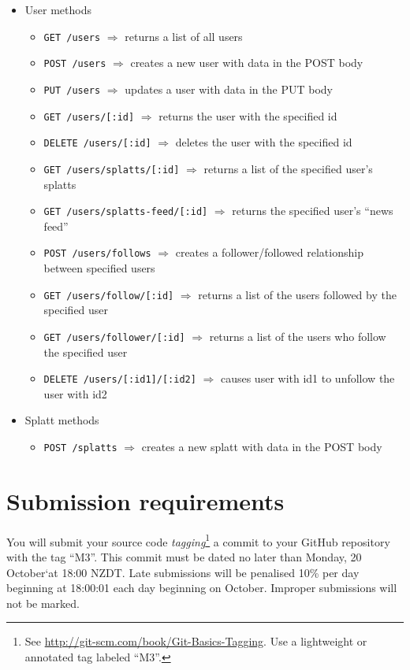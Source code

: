 \documentclass{article}
\begin{document}
\begin{itemize}
 \item User methods
  \begin{itemize}
    \item \texttt{GET /users}  $\Rightarrow$ returns a list of all users
    \item \texttt{POST /users}  $\Rightarrow$ creates a new user with data in the POST body
    \item \texttt{PUT /users}  $\Rightarrow$ updates a user with data in the PUT body
    \item \texttt{GET /users/[:id]} $\Rightarrow$ returns the user with the specified id
    \item \texttt{DELETE /users/[:id]} $\Rightarrow$ deletes the user with the specified id
    \item \texttt{GET /users/splatts/[:id]}  $\Rightarrow$ returns a list of the specified user's splatts
    \item \texttt{GET /users/splatts-feed/[:id]}  $\Rightarrow$ returns the specified user's ``news feed''
    \item \texttt{POST /users/follows}  $\Rightarrow$ creates a follower/followed relationship between specified users
    \item \texttt{GET /users/follow/[:id]}  $\Rightarrow$ returns a list of the users followed by the specified user
    \item \texttt{GET /users/follower/[:id]}  $\Rightarrow$ returns a list of the users who follow the specified user
    \item \texttt{DELETE /users/[:id1]/[:id2]} $\Rightarrow$ causes user with id1 to unfollow the user with id2

  \end{itemize}

 \item Splatt methods
  \begin{itemize}
    
    \item \texttt{POST /splatts}  $\Rightarrow$ creates a new splatt with data in the POST body
  \end{itemize}
\end{itemize}


\section{Submission requirements}
  You will submit your source code \emph{tagging}\footnote{See \url{http://git-scm.com/book/Git-Basics-Tagging}.  Use a lightweight or annotated tag labeled ``M3''.} a commit to your GitHub repository with the tag ``M3''.  This commit must be dated no later than Monday, 20 October`at 18:00 NZDT. Late submissions will be penalised 10\% per day beginning at 18:00:01 each day beginning on October.  Improper submissions will not be marked.  
\end{document}
